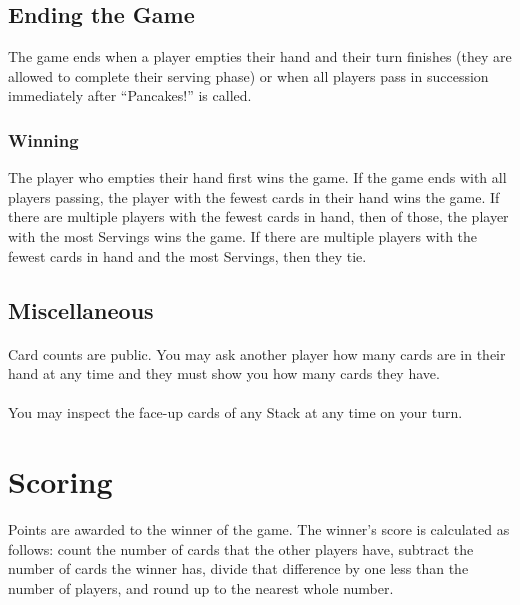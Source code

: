 \documentclass{article}
\begin{document}
\subsection{Ending the Game}
\label{sec:endgame}

The game ends when a player empties their hand and their turn finishes (they are allowed to complete their serving phase) or when all players pass in succession immediately after ``Pancakes!'' is called.

\subsubsection{Winning}
\label{sec:winning}

The player who empties their hand first wins the game. If the game ends with all players passing, the player with the fewest cards in their hand wins the game.
If there are multiple players with the fewest cards in hand, then of those, the player with the most Servings wins the game.
If there are multiple players with the fewest cards in hand and the most Servings, then they tie.

\subsection{Miscellaneous}
\label{sec:misc}

\paragraph{} \label{par:cardcount}
Card counts are public. You may ask another player how many cards are in their hand at any time and they must show you how many cards they have.

\paragraph{} \label{par:inspect}
You may inspect the face-up cards of any Stack at any time on your turn.

\pagebreak
\section{Scoring}
\label{sec:scoring}

Points are awarded to the winner of the game. The winner's score is calculated as follows: count the number of cards that the other players have, subtract the number of cards the winner has, divide that difference by one less than the number of players, and round up to the nearest whole number.
\end{document}
